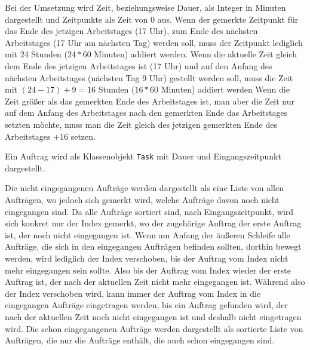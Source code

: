 \documentclass[a4paper,10pt,ngerman]{scrartcl}
\begin{document}
Bei der Umsetzung wird Zeit, beziehungsweise Dauer, als Integer in Minuten dargestellt
und Zeitpunkte als Zeit von 0 aus.
Wenn der gemerkte Zeitpunkt für das Ende des jetzigen Arbeitstages (17 Uhr),
	zum Ende des nächsten Arbeitstages (17 Uhr am nächsten Tag)  werden soll,
	muss der Zeitpunkt lediglich mit 24 Stunden ($24 * 60$ Minuten) addiert werden.
	Wenn die aktuelle Zeit gleich dem Ende des jetzigen Arbeitstages ist (17 Uhr)
	und auf den Anfang des nächsten Arbeitstages (nächsten Tag 9 Uhr) gestellt werden soll,
	muss die Zeit mit $(24 - 17) + 9 = 16$ Stunden ($16 * 60$ Minuten) addiert werden 
Wenn die Zeit größer als das gemerkten Ende des Arbeitstages ist,
	man aber die Zeit nur auf dem Anfang des Arbeitstages nach den gemerkten Ende das Arbeitstages setzten möchte,
	muss man die Zeit gleich des jetzigen gemerkten Ende des Arbeitstages $+ 16$ setzen.

Ein Auftrag wird als Klassenobjekt \texttt{Task} mit Dauer und Eingangszeitpunkt dargestellt.

Die nicht eingegangenen Aufträge werden dargestellt als eine Liste von allen Aufträgen,
	      wo jedoch sich gemerkt wird, welche Aufträge davon noch nicht eingegangen sind.
	      Da alle Aufträge sortiert sind, nach Eingangszeitpunkt, wird sich konkret nur der Index gemerkt,
	      wo der zugehörige Auftrag der erste Auftrag ist, der noch nicht eingegangen ist.
	Wenn am Anfang der äußeren Schleife alle Aufträge,
	die sich in den eingegangen Aufträgen befinden sollten, dorthin bewegt werden,
	wird lediglich der Index verschoben,
	bis der Auftrag vom Index nicht mehr eingegangen sein sollte.
	Also bis der Auftrag vom Index wieder der erste Auftrag ist,
	der nach der aktuellen Zeit nicht mehr eingegangen ist.
	Während also der Index verschoben wird,
	kann immer der Auftrag vom Index in die eingegangen Aufträge eingetragen werden,
	bis ein Auftrag gefunden wird,
	der nach der aktuellen Zeit noch nicht eingegangen ist
	und deshalb nicht eingetragen wird.	
	Die schon eingegangenen Aufträge werden dargestellt als sortierte Liste von Aufträgen,
	      die nur die Aufträge enthält, die auch schon eingegangen sind.
	      
\end{document}
